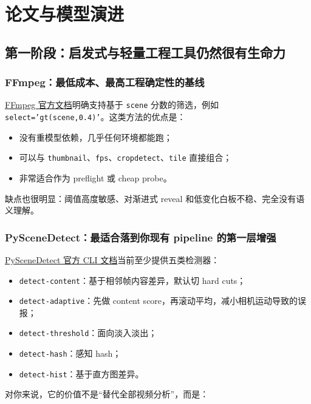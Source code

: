 \documentclass[a4paper]{article}
\begin{document}
\section{论文与模型演进}

\subsection{第一阶段：启发式与轻量工程工具仍然很有生命力}

\subsubsection{FFmpeg：最低成本、最高工程确定性的基线}

\href{https://ffmpeg.org/ffmpeg-filters.html}{FFmpeg 官方文档}明确支持基于 \texttt{scene} 分数的筛选，例如 \texttt{select='gt(scene,0.4)'}。这类方法的优点是：

\begin{itemize}
\item 没有重模型依赖，几乎任何环境都能跑；
\item 可以与 \texttt{thumbnail}、\texttt{fps}、\texttt{cropdetect}、\texttt{tile} 直接组合；
\item 非常适合作为 preflight 或 cheap probe。
\end{itemize}

缺点也很明显：阈值高度敏感、对渐进式 reveal 和低变化白板不稳、完全没有语义理解。

\subsubsection{PySceneDetect：最适合落到你现有 pipeline 的第一层增强}

\href{https://www.scenedetect.com/docs/latest/cli.html}{PySceneDetect 官方 CLI 文档}当前至少提供五类检测器：

\begin{itemize}
\item \texttt{detect-content}：基于相邻帧内容差异，默认切 hard cuts；
\item \texttt{detect-adaptive}：先做 content score，再滚动平均，减小相机运动导致的误报；
\item \texttt{detect-threshold}：面向淡入淡出；
\item \texttt{detect-hash}：感知 hash；
\item \texttt{detect-hist}：基于直方图差异。
\end{itemize}

对你来说，它的价值不是“替代全部视频分析”，而是：
\end{document}
